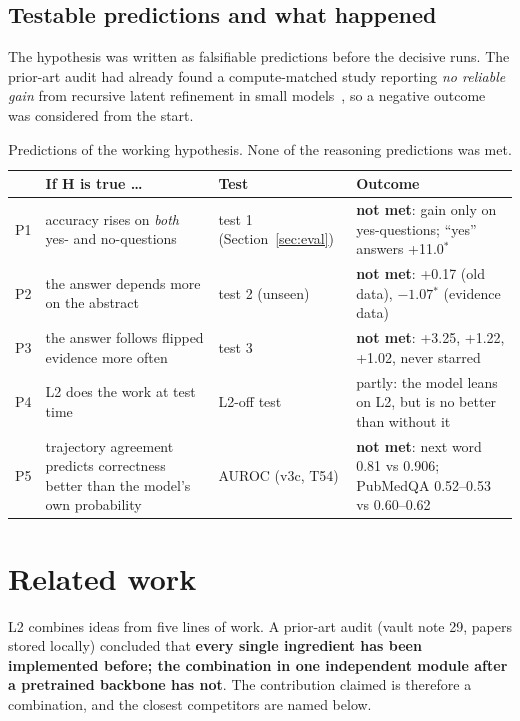 \documentclass[a4paper,11pt,parskip=half]{scrartcl}
\newcommand{\sig}{\ensuremath{^{\ast}}}
\begin{document}
\subsection{Testable predictions and what happened}

The hypothesis was written as falsifiable predictions before the decisive runs.
The prior-art audit had already found a compute-matched study reporting
\emph{no reliable gain} from recursive latent refinement in small
models~\cite{rauba2026tiny}, so a negative outcome was considered from the start.

\begin{table}[H]
\centering\small
\begin{tabularx}{\linewidth}{@{}p{0.6cm}YYp{4.1cm}@{}}
\toprule
& If H is true \dots & Test & Outcome\\
\midrule
P1 & accuracy rises on \emph{both} yes- and no-questions & test 1 (Section~\ref{sec:eval}) & \textbf{not met}: gain only on yes-questions; ``yes'' answers +11.0\sig\\
P2 & the answer depends more on the abstract & test 2 (unseen) & \textbf{not met}: +0.17 (old data), $-1.07$\sig{} (evidence data)\\
P3 & the answer follows flipped evidence more often & test 3 & \textbf{not met}: +3.25, +1.22, +1.02, never starred\\
P4 & L2 does the work at test time & L2-off test & partly: the model leans on L2, but is no better than without it\\
P5 & trajectory agreement predicts correctness better than the model's own probability & AUROC (v3c, T54) & \textbf{not met}: next word 0.81 vs 0.906; PubMedQA 0.52--0.53 vs 0.60--0.62\\
\bottomrule
\end{tabularx}
\caption{Predictions of the working hypothesis. None of the reasoning predictions was met.}
\end{table}

\section{Related work}
\label{sec:related}

L2 combines ideas from five lines of work. A prior-art audit (vault note 29,
papers stored locally) concluded that \textbf{every single ingredient has been
implemented before; the combination in one independent module after a
pretrained backbone has not}. The contribution claimed is therefore a
combination, and the closest competitors are named below.
\end{document}
